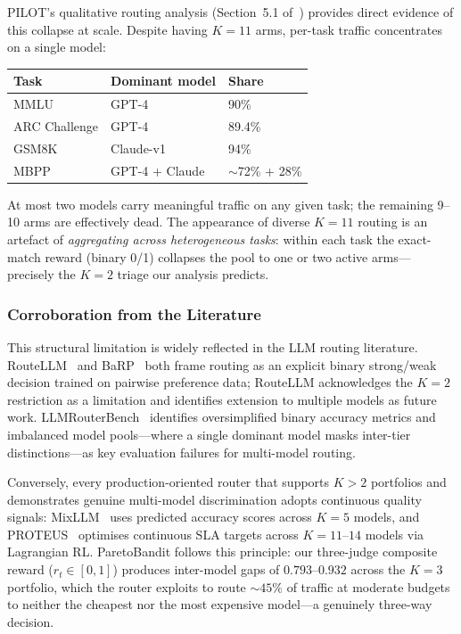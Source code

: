 PILOT's qualitative routing analysis (Section~5.1
of~\cite{panda2025pilot}) provides direct evidence of this
collapse at scale.
Despite having $K{=}11$ arms, per-task traffic concentrates on a
single model:

\begin{center}
\small
\begin{tabular}{@{}lll@{}}
\toprule
\textbf{Task} & \textbf{Dominant model} & \textbf{Share} \\
\midrule
MMLU          & GPT-4        & 90\% \\
ARC Challenge & GPT-4        & 89.4\% \\
GSM8K         & Claude-v1    & 94\% \\
MBPP          & GPT-4 + Claude & $\sim$72\% + 28\% \\
\bottomrule
\end{tabular}
\end{center}

\noindent
At most two models carry meaningful traffic on any given task;
the remaining 9--10 arms are effectively dead.
The appearance of diverse $K{=}11$ routing is an artefact of
\emph{aggregating across heterogeneous tasks}: within each task
the exact-match reward (binary 0/1) collapses the pool to
one or two active arms---precisely the $K{=}2$ triage
our analysis predicts.

\subsubsection{Corroboration from the Literature}

This structural limitation is widely reflected in the LLM routing
literature.
RouteLLM~\cite{ong2024routellm} and BaRP~\cite{wang2025barp}
both frame routing as an explicit binary strong/weak decision
trained on pairwise preference data; RouteLLM acknowledges the
$K{=}2$ restriction as a limitation and identifies extension to
multiple models as future work.
LLMRouterBench~\cite{li2026llmrouterbench} identifies
oversimplified binary accuracy metrics and imbalanced model
pools---where a single dominant model masks inter-tier
distinctions---as key evaluation failures for multi-model routing.

Conversely, every production-oriented router that supports
$K{>}2$ portfolios and demonstrates genuine multi-model
discrimination adopts continuous quality signals:
MixLLM~\cite{wang2025mixllm} uses predicted accuracy scores
across $K{=}5$ models, and
PROTEUS~\cite{bhatti2026proteus} optimises continuous SLA targets
across $K{=}11$--$14$ models via Lagrangian RL.
ParetoBandit follows this principle: our three-judge composite
reward ($r_t \in [0,1]$) produces inter-model gaps of
$0.793$--$0.932$ across the $K{=}3$ portfolio, which the router
exploits to route ${\sim}45\%$ of traffic at moderate budgets
to neither the cheapest nor the most expensive model---a
genuinely three-way decision.

